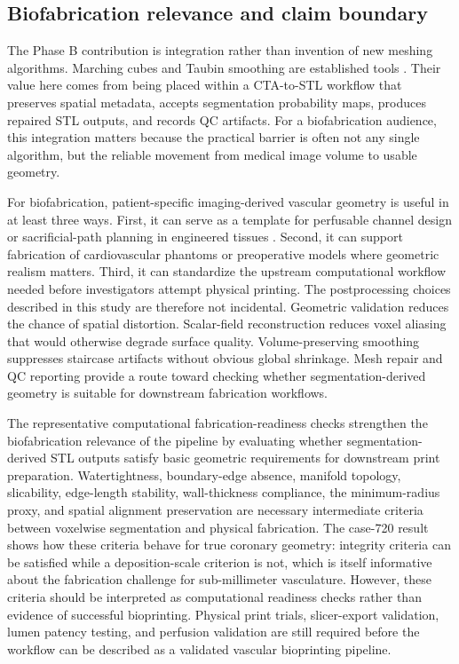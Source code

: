 \documentclass[anonymous]{iopjournal}
\begin{document}
\subsection{Biofabrication relevance and claim boundary}

The Phase B contribution is integration rather than invention of new meshing algorithms. Marching cubes and Taubin smoothing are established tools \cite{lorensen1987,lewiner2003,taubin1995}. Their value here comes from being placed within a CTA-to-STL workflow that preserves spatial metadata, accepts segmentation probability maps, produces repaired STL outputs, and records QC artifacts. For a biofabrication audience, this integration matters because the practical barrier is often not any single algorithm, but the reliable movement from medical image volume to usable geometry.

For biofabrication, patient-specific imaging-derived vascular geometry is useful in at least three ways. First, it can serve as a template for perfusable channel design or sacrificial-path planning in engineered tissues \cite{kolesky2014,hinton2015}. Second, it can support fabrication of cardiovascular phantoms or preoperative models where geometric realism matters. Third, it can standardize the upstream computational workflow needed before investigators attempt physical printing. The postprocessing choices described in this study are therefore not incidental. Geometric validation reduces the chance of spatial distortion. Scalar-field reconstruction reduces voxel aliasing that would otherwise degrade surface quality. Volume-preserving smoothing suppresses staircase artifacts without obvious global shrinkage. Mesh repair and QC reporting provide a route toward checking whether segmentation-derived geometry is suitable for downstream fabrication workflows.

The representative computational fabrication-readiness checks strengthen the biofabrication relevance of the pipeline by evaluating whether segmentation-derived STL outputs satisfy basic geometric requirements for downstream print preparation. Watertightness, boundary-edge absence, manifold topology, slicability, edge-length stability, wall-thickness compliance, the minimum-radius proxy, and spatial alignment preservation are necessary intermediate criteria between voxelwise segmentation and physical fabrication. The case-720 result shows how these criteria behave for true coronary geometry: integrity criteria can be satisfied while a deposition-scale criterion is not, which is itself informative about the fabrication challenge for sub-millimeter vasculature. However, these criteria should be interpreted as computational readiness checks rather than evidence of successful bioprinting. Physical print trials, slicer-export validation, lumen patency testing, and perfusion validation are still required before the workflow can be described as a validated vascular bioprinting pipeline.
\end{document}
